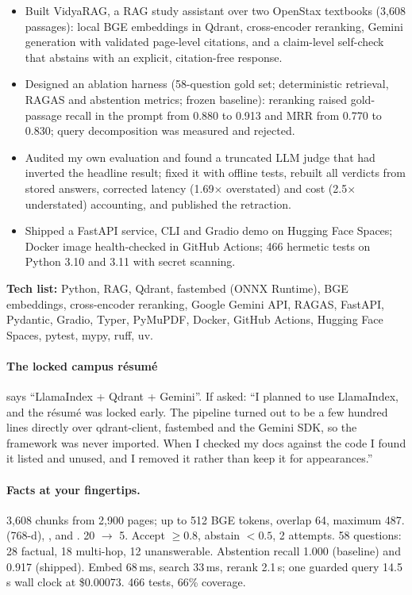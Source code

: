 \begin{recommended}
\begin{itemize}
  \item Built VidyaRAG, a RAG study assistant over two OpenStax textbooks (3,608 passages): local BGE embeddings in Qdrant, cross-encoder reranking, Gemini generation with validated page-level citations, and a claim-level self-check that abstains with an explicit, citation-free response.
  \item Designed an ablation harness (58-question gold set; deterministic retrieval, RAGAS and abstention metrics; frozen baseline): reranking raised gold-passage recall in the prompt from 0.880 to 0.913 and MRR from 0.770 to 0.830; query decomposition was measured and rejected.
  \item Audited my own evaluation and found a truncated LLM judge that had inverted the headline result; fixed it with offline tests, rebuilt all verdicts from stored answers, corrected latency (1.69$\times$ overstated) and cost (2.5$\times$ understated) accounting, and published the retraction.
  \item Shipped a FastAPI service, CLI and Gradio demo on Hugging Face Spaces; Docker image health-checked in GitHub Actions; 466 hermetic tests on Python 3.10 and 3.11 with secret scanning.
\end{itemize}
\textbf{Tech list:} Python, RAG, Qdrant, fastembed (ONNX Runtime), BGE embeddings, cross-encoder reranking, Google Gemini API, RAGAS, FastAPI, Pydantic, Gradio, Typer, PyMuPDF, Docker, GitHub Actions, Hugging Face Spaces, pytest, mypy, ruff, uv.
\end{recommended}

\paragraph{The locked campus résumé} says ``LlamaIndex + Qdrant + Gemini''. If asked: ``I planned to use LlamaIndex, and the résumé was locked early. The pipeline turned out to be a few hundred lines directly over qdrant-client, fastembed and the Gemini SDK, so the framework was never imported. When I checked my docs against the code I found it listed and unused, and I removed it rather than keep it for appearances.''

\paragraph{Facts at your fingertips.} 3,608 chunks from 2,900 pages; up to 512 BGE tokens, overlap 64, maximum 487.  (768-d), ,  and . 20 $\rightarrow$ 5. Accept $\ge0.8$, abstain $<0.5$, 2 attempts. 58 questions: 28 factual, 18 multi-hop, 12 unanswerable. Abstention recall 1.000 (baseline) and 0.917 (shipped). Embed 68\,ms, search 33\,ms, rerank 2.1\,s; one guarded query 14.5\,s wall clock at \$0.00073. 466 tests, 66\% coverage.

